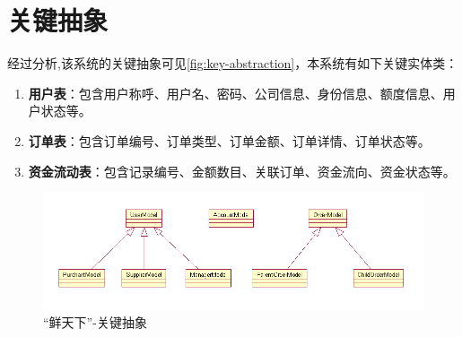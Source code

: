 \section{关键抽象}

经过分析,该系统的关键抽象可见\autoref{fig:key-abstraction}，本系统有如下关键实体类：

\begin{enumerate}
    \item \textbf{用户表}：包含用户称呼、用户名、密码、公司信息、身份信息、额度信息、用户状态等。
    \item \textbf{订单表}：包含订单编号、订单类型、订单金额、订单详情、订单状态等。
    \item \textbf{资金流动表}：包含记录编号、金额数目、关联订单、资金流向、资金状态等。
\end{enumerate}


\begin{figure}[htp]
    \centering
    \includegraphics[width=15cm]{figure/key_abstraction_new.png}
    \caption{“鲜天下”-关键抽象}
    \label{fig:key-abstraction}
\end{figure}
